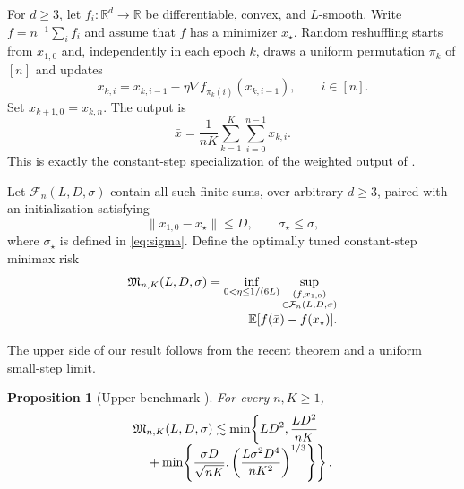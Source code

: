 \documentclass[twoside]{article}
\newtheorem{proposition}[theorem]{Proposition}
\newcommand{\E}{\mathbb E}
\newcommand{\R}{\mathbb R}
\newcommand{\cF}{\mathcal F}
\newcommand{\asympup}{\mathrel{\lesssim}}
\begin{document}
For $d\ge3$, let $f_i:\R^d\to\R$ be differentiable, convex, and $L$-smooth. Write $f=n^{-1}\sum_i f_i$ and assume that $f$ has a minimizer $x_\star$. Random reshuffling starts from $x_{1,0}$ and, independently in each epoch $k$, draws a uniform permutation $\pi_k$ of $[n]$ and updates
\begin{equation}
 x_{k,i}=x_{k,i-1}-\eta\nabla f_{\pi_k(i)}(x_{k,i-1}),
 \qquad i\in[n].
 \label{eq:rr}
\end{equation}
Set $x_{k+1,0}=x_{k,n}$. The output is
\begin{equation}
 \bar x=\frac{1}{nK}\sum_{k=1}^K\sum_{i=0}^{n-1}x_{k,i}.
 \label{eq:output}
\end{equation}
This is exactly the constant-step specialization of the weighted output of \citet{liu2026dominates}.

Let $\cF_n(L,D,\sigma)$ contain all such finite sums, over arbitrary $d\ge3$, paired with an initialization satisfying
\begin{equation}
 \lVert x_{1,0}-x_\star\rVert\le D,
 \qquad \sigma_\star\le\sigma,
 \label{eq:class}
\end{equation}
where $\sigma_\star$ is defined in \eqref{eq:sigma}. Define the optimally tuned constant-step minimax risk
\begin{equation}
\begin{aligned}
 \mathfrak M_{n,K}(L,D,\sigma)
 =\inf_{0<\eta\le1/(6L)}
 \sup_{\substack{(f,x_{1,0})\\
 \in\cF_n(L,D,\sigma)}}\\[-0.5ex]
 \hspace{2.8em}\E[f(\bar x)-f(x_\star)].
\end{aligned}
 \label{eq:minimax}
\end{equation}

The upper side of our result follows from the recent theorem and a uniform small-step limit.

\begin{proposition}[Upper benchmark \citealp{liu2026dominates}]
\label{prop:upper}
For every $n,K\ge1$,
\begin{align}
 \mathfrak M_{n,K}(L,D,\sigma)
 \asympup
 \min\!\left\{LD^2,\frac{LD^2}{nK}\right.\quad\notag\\[-1ex]
 \left.{}+\min\!\left\{
 \frac{\sigma D}{\sqrt{nK}},
 \left(\frac{L\sigma^2D^4}{nK^2}\right)^{1/3}
 \right\}\right\}.
 \label{eq:upper}
\end{align}
\end{proposition}
\end{document}
